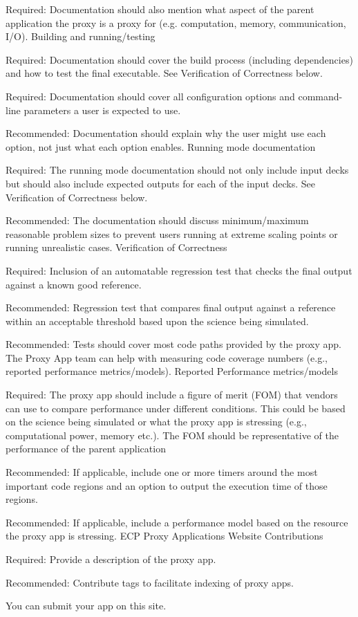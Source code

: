 Required: Documentation should also mention what aspect of the parent application the proxy is a proxy for (e.g. computation, memory, communication, I/O).
Building and running/testing

Required: Documentation should cover the build process (including dependencies) and how to test the final executable. See Verification of Correctness below.

Required: Documentation should cover all configuration options and command-line parameters a user is expected to use.

Recommended: Documentation should explain why the user might use each option, not just what each option enables.
Running mode documentation

Required: The running mode documentation should not only include input decks but should also include expected outputs for each of the input decks. See Verification of Correctness below.

Recommended: The documentation should discuss minimum/maximum reasonable problem sizes to prevent users running at extreme scaling points or running unrealistic cases.
Verification of Correctness

Required: Inclusion of an automatable regression test that checks the final output against a known good reference.

Recommended: Regression test that compares final output against a reference within an acceptable threshold based upon the science being simulated.

Recommended: Tests should cover most code paths provided by the proxy app. The Proxy App team can help with measuring code coverage numbers (e.g., reported performance metrics/models).
Reported Performance metrics/models

Required: The proxy app should include a figure of merit (FOM) that vendors can use to compare performance under different conditions. This could be based on the science being simulated or what the proxy app is stressing (e.g., computational power, memory etc.). The FOM should be representative of the performance of the parent application

Recommended: If applicable, include one or more timers around the most important code regions and an option to output the execution time of those regions.

Recommended: If applicable, include a performance model based on the resource the proxy app is stressing.
ECP Proxy Applications Website Contributions

Required: Provide a description of the proxy app.

Recommended: Contribute tags to facilitate indexing of proxy apps.

You can submit your app on this site.

